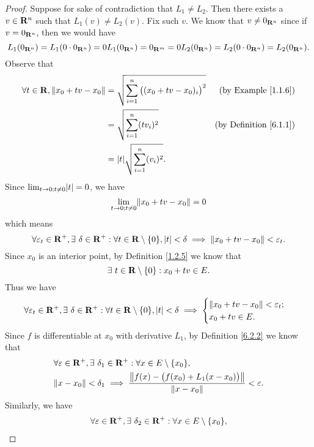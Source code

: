 \begin{proof}
    Suppose for sake of contradiction that \(L_1 \neq L_2\).
    Then there exists a \(v \in \R^n\) such that \(L_1(v) \neq L_2(v)\).
    Fix such \(v\).
    We know that \(v \neq 0_{\R^n}\) since if \(v = 0_{\R^n}\), then we would have
    \[
        L_1(0_{\R^n}) = L_1(0 \cdot 0_{\R^n}) = 0 L_1(0_{\R^n}) = 0_{\R^m} = 0 L_2(0_{\R^n}) = L_2(0 \cdot 0_{\R^n}) = L_2(0_{\R^n}).
    \]
    Observe that
    \begin{align*}
        \forall t \in \R, \norm*{x_0 + tv - x_0} & = \sqrt{\sum_{i = 1}^n \big((x_0 + tv - x_0)_i\big)^2} & \text{(by Example \ref{1.1.6})}    \\
                                                 & = \sqrt{\sum_{i = 1}^n (t v_i)^2}                      & \text{(by Definition \ref{6.1.1})} \\
                                                 & = \abs{t} \sqrt{\sum_{i = 1}^n (v_i)^2}.
    \end{align*}
    Since \(\lim_{t \to 0 ; t \neq 0} \abs{t} = 0\), we have
    \[
        \lim_{t \to 0 ; t \neq 0} \norm*{x_0 + tv - x_0} = 0
    \]
    which means
    \[
        \forall \varepsilon_t \in \R^+, \exists\ \delta \in \R^+ : \forall t \in \R \setminus \{0\}, \abs{t} < \delta \implies \norm*{x_0 + tv - x_0} < \varepsilon_t.
    \]
    Since \(x_0\) is an interior point, by Definition \ref{1.2.5} we know that
    \[
        \exists\ t \in \R \setminus \{0\} : x_0 + tv \in E.
    \]
    Thus we have
    \[
        \forall \varepsilon_t \in \R^+, \exists\ \delta \in \R^+ : \forall t \in \R \setminus \{0\}, \abs{t} < \delta \implies \begin{cases}
            \norm*{x_0 + tv - x_0} < \varepsilon_t; \\
            x_0 + tv \in E.
        \end{cases}
    \]
    Since \(f\) is differentiable at \(x_0\) with derivative \(L_1\), by Definition \ref{6.2.2} we know that
    \begin{align*}
         & \forall \varepsilon \in \R^+, \exists\ \delta_1 \in \R^+ : \forall x \in E \setminus \{x_0\},                             \\
         & \norm*{x - x_0} < \delta_1 \implies \frac{\norm*{f(x) - \big(f(x_0) + L_1(x - x_0)\big)}}{\norm*{x - x_0}} < \varepsilon.
    \end{align*}
    Similarly, we have
    \begin{align*}
         & \forall \varepsilon \in \R^+, \exists\ \delta_2 \in \R^+ : \forall x \in E \setminus \{x_0\},                             \\

\end{align*}
\end{proof}
